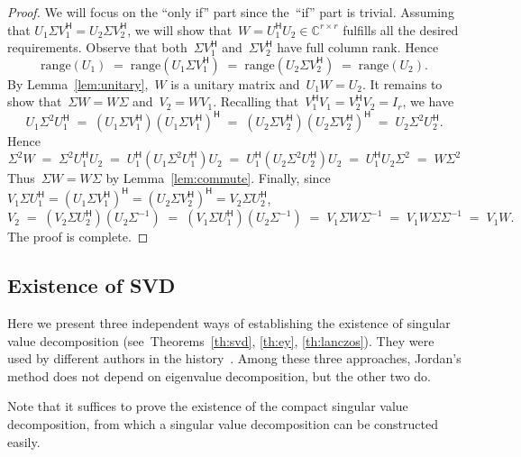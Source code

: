 \documentclass[11pt,a4paper]{article}  %
\numberwithin{equation}{section}
\theoremstyle{definition}
\def\CC{\mathbb{C}}
\newcommand{\hmt}{{\scriptscriptstyle{{\mathsf{H}}}}}
\newcommand{\range}{\mathrm{range}}
\begin{document}
\begin{proof}
We will focus on the ``only if'' part since the~``if'' part is trivial.
Assuming that $U_1\Sigma V_1^\hmt = U_2\Sigma V_2^\hmt$,
we will show that~$W = U_1^\hmt U_2\in \CC^{r\times r}$ fulfills all the desired requirements.
Observe that both~$\Sigma V_1^\hmt$ and~$\Sigma V_2^\hmt$ have full column rank. Hence
\begin{equation*}
  \range(U_1) \;=\; \range(U_1\Sigma V_1^\hmt)
  \;=\; \range(U_2\Sigma V_2^\hmt) \;=\; \range(U_2).
\end{equation*}
By Lemma~\ref{lem:unitary},~$W$ is a unitary matrix and~$U_1W = U_2$.
It remains to show that~$\Sigma W = W\Sigma$ and~$V_2 = WV_1$.
Recalling that~$V_1^\hmt V_1 = V_2^\hmt V_2= I_r$, we have
\begin{equation}
  \nonumber
  U_1\Sigma^2 U_1^\hmt
  \;=\; (U_1\Sigma V_1^\hmt) (U_1 \Sigma V_1^\hmt)^\hmt
  \;=\; (U_2\Sigma V_2^\hmt) (U_2 \Sigma V_2^\hmt)^\hmt
  \;=\; U_2\Sigma^2 U_2^\hmt.
\end{equation}
Hence
\begin{equation*}
  \Sigma^2W
  \;=\;\Sigma^2U_1^\hmt U_2
  \;=\; U_1^\hmt(U_1 \Sigma^2 U_1^\hmt) U_2
  \;=\; U_1^\hmt(U_2 \Sigma^2 U_2^\hmt) U_2
  \;=\; U_1^\hmt U_2 \Sigma^2
  \;=\; W\Sigma^2
\end{equation*}
Thus~$\Sigma W=W\Sigma$ by Lemma~\ref{lem:commute}.
Finally, since~$V_1 \Sigma U_1^\hmt =(U_1\Sigma V_1^\hmt)^\hmt = (U_2\Sigma V_2^\hmt)^\hmt= V_2 \Sigma
U_2^\hmt$,
\begin{equation*}
  V_2
  \;=\;(V_2\Sigma U_2^\hmt)(U_2 \Sigma^{-1})
  \;=\;(V_1\Sigma U_1^\hmt)(U_2 \Sigma^{-1})
  \;=\; V_1 \Sigma W \Sigma^{-1}
  \;=\; V_1 W \Sigma \Sigma^{-1}
  \;=\; V_1W.
\end{equation*}
The proof is complete.
\end{proof}


\subsection{Existence of SVD}

Here we present three independent ways of establishing the existence of
singular value decomposition (see~Theorems~\ref{th:svd}, \ref{th:ey}, \ref{th:lanczos}).
They were used by different authors in the history~\cite{Stewart_1993}.
Among these three approaches, Jordan's method does not depend on eigenvalue decomposition, but the
other two do.

Note that it suffices to prove the existence of the compact singular value decomposition, from which
a singular value decomposition can be constructed easily.
\end{document}
